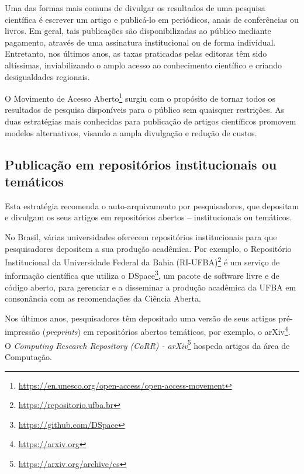 
Uma das formas mais comuns de divulgar os resultados de uma pesquisa científica é escrever um artigo e publicá-lo em periódicos, anais de conferências ou livros. 
%
Em geral, tais publicações são disponibilizadas ao público mediante pagamento, através de uma assinatura institucional ou de forma individual. Entretanto, nos últimos anos, as taxas praticadas pelas editoras têm sido altíssimas, inviabilizando o amplo acesso ao conhecimento científico e criando desigualdades regionais.

O Movimento de Acesso Aberto\footnote{\url{https://en.unesco.org/open-access/open-access-movement}} surgiu com o propósito de
tornar todos os resultados de pesquisa disponíveis para o público sem quaisquer restrições. 
As duas estratégias mais conhecidas para publicação de artigos científicos promovem modelos alternativos, visando a ampla divulgação e redução de custos. 

\subsection*{Publicação em repositórios institucionais ou temáticos}

Esta estratégia recomenda o auto-arquivamento por pesquisadores, que depositam e divulgam os seus artigos em repositórios abertos -- institucionais ou temáticos. 

No Brasil, várias universidades oferecem repositórios institucionais para que pesquisadores depositem a sua produção acadêmica. 
Por exemplo, o Repositório Institucional da Universidade Federal da Bahia (RI-UFBA)\footnote{\url{https://repositorio.ufba.br}} é um serviço de informação científica que utiliza o DSpace\footnote{\url{https://github.com/DSpace}}, um pacote de software livre e de código aberto, para gerenciar e a disseminar a produção acadêmica da UFBA em consonância com as recomendações da Ciência Aberta. 

Nos últimos anos, pesquisadores têm depositado uma versão de seus artigos pré-impressão (\textit{preprints}) em repositórios abertos temáticos, por exemplo, o arXiv\footnote{\url{https://arxiv.org}}. 
O \textit{Computing Research Repository (CoRR) - arXiv}\footnote{\url{https://arxiv.org/archive/cs}} hospeda artigos da área de Computação.

